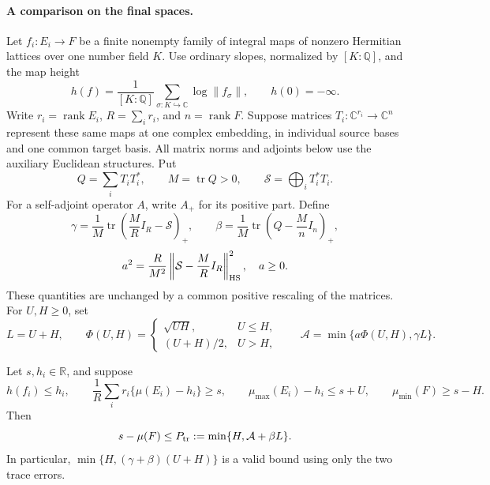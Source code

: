 \paragraph{A comparison on the final spaces.}
Let \(f_i:E_i\to F\) be a finite nonempty family of integral maps of
nonzero Hermitian lattices over one number field \(K\). Use ordinary
slopes, normalized by \([K:\mathbb Q]\), and the map height
\[
 h(f)=\frac1{[K:\mathbb Q]}\sum_{\sigma:K\hookrightarrow\mathbb C}
                  \log\|f_\sigma\|,\qquad h(0)=-\infty.
\]
Write \(r_i=\operatorname{rank}E_i\), \(R=\sum_i r_i\), and
\(n=\operatorname{rank}F\). Suppose matrices
\(T_i:\mathbb C^{r_i}\to\mathbb C^n\) represent these same maps at
one complex embedding, in individual source bases and one common
target basis. All matrix norms and adjoints below use the auxiliary
Euclidean structures. Put
\[
 Q=\sum_iT_iT_i^*,\qquad M=\operatorname{tr}Q>0,\qquad
 \mathcal S=\bigoplus_iT_i^*T_i.
\]
For a self-adjoint operator \(A\), write \(A_+\) for its positive part.
Define
\[
 \gamma=\frac1M\operatorname{tr}\left(\frac MR I_R-\mathcal S\right)_+,
 \qquad
 \beta=\frac1M\operatorname{tr}\left(Q-\frac Mn I_n\right)_+,
\]
\[
 a^2=\frac R{M^2}\left\|\mathcal S-\frac MR I_R\right\|_{\rm HS}^2,
 \quad a\ge0.
\]
These quantities are unchanged by a common positive rescaling of the
matrices. For \(U,H\ge0\), set
\[
 L=U+H,\qquad
 \Phi(U,H)=
 \begin{cases}\sqrt{UH},&U\le H,\\(U+H)/2,&U>H,\end{cases}
 \qquad \mathcal A=\min\{a\Phi(U,H),\gamma L\}.
\]

\begin{theorem}
\label{shared-trace-slope}
Let \(s,h_i\in\mathbb R\), and suppose
\[
 h(f_i)\le h_i,\qquad
 \frac1R\sum_i r_i\{\mu(E_i)-h_i\}\ge s,\qquad
 \mu_{\max}(E_i)-h_i\le s+U,\qquad
 \mu_{\min}(F)\ge s-H.
\]
Then
\begin{equation}\label{shared-trace-slope-bound}
 s-\mu(F)\le P_{\rm tr}:=\min\{H,\mathcal A+\beta L\}.
\end{equation}
In particular, \(\min\{H,(\gamma+\beta)(U+H)\}\) is a valid bound
using only the two trace errors.
\end{theorem}

